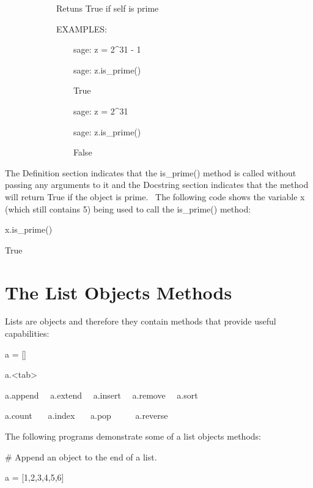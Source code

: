 \documentclass[12pt,twoside]{book}
\begin{document}
\bigskip

\ \ \ \ \ \ \ \ \ \ \ \ Retuns True if self is prime 


\bigskip

\ \ \ \ \ \ \ \ \ \ \ \ EXAMPLES: 

\ \ \ \ \ \ \ \ \ \ \ \ \ \ \ \ sage: z = 2\^{}31 {}- 1 

\ \ \ \ \ \ \ \ \ \ \ \ \ \ \ \ sage: z.is\_prime() 

\ \ \ \ \ \ \ \ \ \ \ \ \ \ \ \ True 

\ \ \ \ \ \ \ \ \ \ \ \ \ \ \ \ sage: z = 2\^{}31 

\ \ \ \ \ \ \ \ \ \ \ \ \ \ \ \ sage: z.is\_prime() 

\ \ \ \ \ \ \ \ \ \ \ \ \ \ \ \ False 


\bigskip

The Definition section indicates that the is\_prime() method is called
without passing any arguments to it and the Docstring section indicates
that the method will return True if the object is prime. \ The
following code shows the variable x (which still contains 5) being used
to call the is\_prime() method:


\bigskip

x.is\_prime()

{\textbar}

True

\section[The List Object{\textquotesingle}s Methods]{
The List Object{\textquotesingle}s Methods}

Lists are objects and therefore they contain methods that provide useful
capabilities:


\bigskip

a = []

a.{\textless}tab{\textgreater}

{\textbar}

a.append \ \ a.extend \ \ a.insert \ \ a.remove \ \ a.sort 

a.count \ \ \ a.index \ \ \ a.pop \ \ \ \ \ a.reverse 


\bigskip

The following programs demonstrate some of a list
object{\textquotesingle}s methods:


\bigskip

\# Append an object to the end of a list.

a = [1,2,3,4,5,6]
\end{document}
